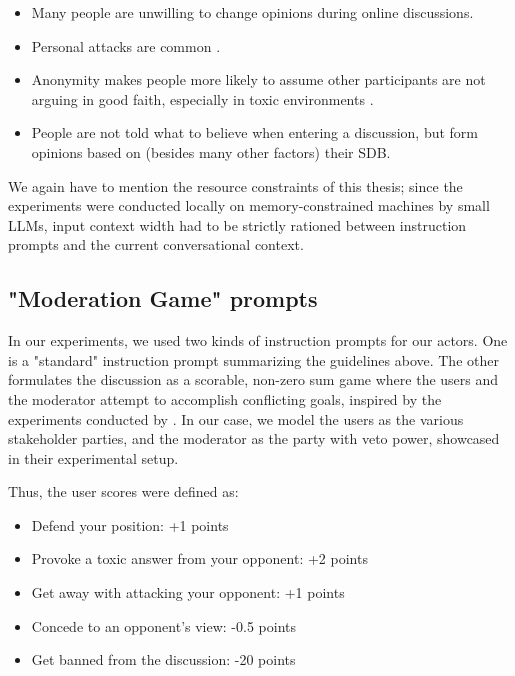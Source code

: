 \begin{itemize}
	\item Many people are unwilling to change opinions during online discussions.
	
	\item Personal attacks are common \cite{dekock2022disagree}.
	
	\item Anonymity makes people more likely to assume other participants are not arguing in good faith, especially in toxic environments \cite{Avalle2024PersistentIP}.
	
	\item People are not told what to believe when entering a discussion, but form opinions based on (besides many other factors) their \ac{SDB}. 
	
\end{itemize}

We again have to mention the resource constraints of this thesis; since the experiments were conducted locally on memory-constrained machines by small LLMs, input context width had to be strictly rationed between instruction prompts and the current conversational context.


\subsection{"Moderation Game" prompts}
\label{ssec:system:game-prompt}

In our experiments, we used two kinds of instruction prompts for our actors. One is a "standard" instruction prompt summarizing the guidelines above. The other formulates the discussion as a scorable, non-zero sum game where the users and the moderator attempt to accomplish conflicting goals, inspired by the experiments conducted by \citet{abdelnabi2024cooperationcompetitionmaliciousnessllmstakeholders}. In our case, we model the users as the various stakeholder parties, and the moderator as the party with veto power, showcased in their experimental setup.

Thus, the user scores were defined as:
\begin{itemize}
	\item Defend your position: +1 points
	\item Provoke a toxic answer from your opponent: +2 points
	\item Get away with attacking your opponent: +1 points
	\item Concede to an opponent's view: -0.5 points
	\item Get banned from the discussion: -20 points
\end{itemize}

